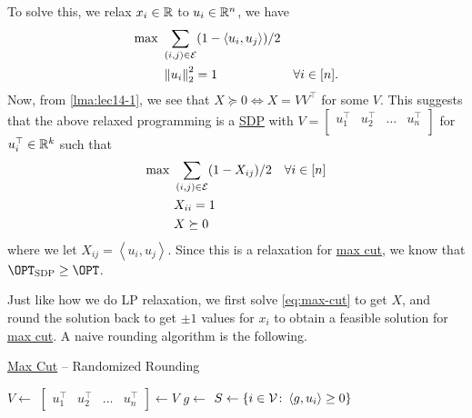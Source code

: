 To solve this, we relax \(x_i\in \mathbb{\MakeUppercase{r}} \) to \(u_i\in \mathbb{\MakeUppercase{r}} ^n\), we have
\[
	\begin{aligned}
		\max~ & \sum_{(i, j)\in \mathcal{\MakeUppercase{e}}} ( 1 - \left\langle u_i, u_j \right\rangle ) / 2                     \\
		      & \left\lVert u_i\right\rVert _2 ^{2} = 1                                                      & \forall i\in [n].
	\end{aligned}
\]
Now, from \autoref{lma:lec14-1}, we see that \(X \succeq 0 \iff X = V V^{\top} \) for some \(V\). This suggests that the above relaxed programming is a \hyperref[def:SDP]{SDP} with \(V = \begin{bmatrix}
	u_1 ^{\top} & u_2 ^{\top} & \ldots & u_n ^{\top} \\
\end{bmatrix}\) for \(u_i ^{\top} \in \mathbb{\MakeUppercase{r}} ^k\) such that
\begin{equation}\label{eq:max-cut}
	\begin{aligned}
		\max~ & \sum_{(i, j)\in \mathcal{\MakeUppercase{e}}} ( 1 - X_{ij} ) / 2 & \forall i\in [n] \\
		      & X_{ii} = 1                                                                         \\
		      & X \succeq 0
	\end{aligned}
\end{equation}
where we let \(X_{ij} = \left\langle u_i, u_j \right\rangle \). Since this is a relaxation for \hyperref[prb:max-cut]{max cut}, we know that \(\OPT_{\mathrm{SDP} } \geq \OPT\).

Just like how we do LP relaxation, we first solve \autoref{eq:max-cut} to get \(X\), and round the solution back to get \(\pm 1\) values for \(x_i\) to obtain a feasible solution for \hyperref[prb:max-cut]{max cut}. A naive rounding algorithm is the following.

\begin{algorithm}[H]\label{algo:max-cut-randomized-rounding}
	\DontPrintSemicolon
	\caption{\hyperref[prb:max-cut]{Max Cut} -- Randomized Rounding}
	\BlankLine
	\(V\gets\)
	\(\begin{bmatrix}u_1 ^{\top} & u_2 ^{\top} & \ldots & u_n ^{\top}\end{bmatrix}\gets V\)\;
	\(g\gets\)
	\(S\gets \left\{ i\in \mathcal{\MakeUppercase{v}} \colon \left\langle g, u_i \right\rangle \geq 0 \right\} \)
	\;
\end{algorithm}

